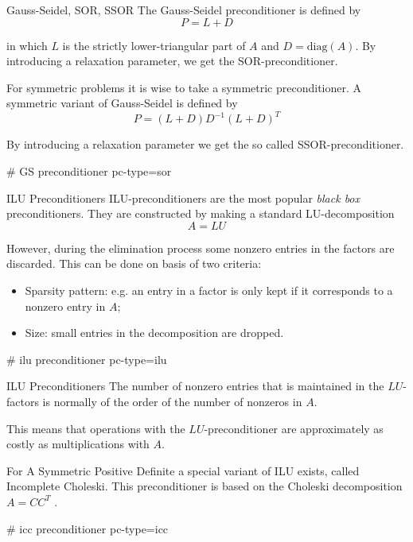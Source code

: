 \begin{frame}[fragile]{Gauss-Seidel, SOR, SSOR}
  The Gauss-Seidel preconditioner is defined by
  \begin{equation*}
    P = L + D
  \end{equation*}

in which $L$ is the strictly lower-triangular part of $A$ and
$D = \textrm{diag}(A)$. By introducing a relaxation parameter, we get the
  SOR-preconditioner.

For symmetric problems it is wise to take a symmetric
preconditioner. A symmetric variant of Gauss-Seidel is defined
by
\begin{equation*}
P = (L + D)D^{-1}(L + D)^T
\end{equation*}

By introducing a relaxation parameter we get the so called
SSOR-preconditioner.

\begin{bashcode}
  # GS preconditioner
  pc-type=sor
\end{bashcode}
\end{frame}

\begin{frame}[fragile]{ILU Preconditioners}
  ILU-preconditioners are the most popular \emph{black box}
preconditioners. They are constructed by making a standard
LU-decomposition
\begin{equation*}
A = LU
\end{equation*}

However, during the elimination process some nonzero entries in
the factors are discarded. This can be done on basis of two
criteria:
\begin{itemize}
\item Sparsity pattern: e.g. an entry in a factor is only kept if it
corresponds to a nonzero entry in $A$;
\item Size: small entries in the decomposition are dropped.
\end{itemize}

\begin{bashcode}
  # ilu preconditioner
  pc-type=ilu
\end{bashcode}


\end{frame}

\begin{frame}[fragile]{ILU Preconditioners}
  The number of nonzero entries that is maintained in the
$LU$-factors is normally of the order of the number of nonzeros in
$A$.

This means that operations with the $LU$-preconditioner are
approximately as costly as multiplications with $A$.

For A Symmetric Positive Definite a special variant of ILU exists,
called Incomplete Choleski. This preconditioner is based on the
Choleski decomposition $A = CC^T$ .

\begin{bashcode}
  # icc preconditioner
  pc-type=icc
\end{bashcode}

\end{frame}

